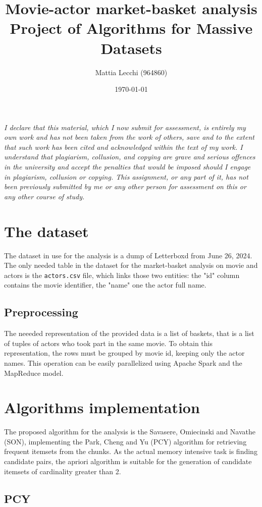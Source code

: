 \documentclass{article}
\author{Mattia Lecchi (964860)}
\date{\today}
\title{Movie-actor market-basket analysis\\ 
	\large Project of Algorithms for Massive Datasets}
\begin{document}
\maketitle
\textit{I declare that this material, which
	I now submit for assessment, is entirely my own work and has not been taken from the
	work of others, save and to the extent that such work has been cited and acknowledged within the
	text of my work. I understand that plagiarism, collusion, and copying are grave and
	serious offences in the university and accept the penalties that would be imposed should I engage
	in plagiarism, collusion or copying. This assignment, or any part of it, has not been previously
	submitted by me or any other person for assessment on this or any other course of study.}

\section{The dataset}
\label{sec:dataset}
The dataset in use for the analysis is a dump of Letterboxd from June 26, 2024.
The only needed table in the dataset for the market-basket analysis on movie and actors is the \texttt{actors.csv} file, which links those two entities: the "id" column contains the movie identifier, the "name" one the actor full name. 

\subsection{Preprocessing}
The neeeded representation of the provided data is a list of baskets, that is a list of tuples of actors who took part in the same movie. To obtain this representation, the rows must be grouped by movie id, keeping only the actor names. This operation can be easily parallelized using Apache Spark and the MapReduce model. 

\section{Algorithms implementation}

The proposed algorithm for the analysis is the Savasere, Omiecinski and Navathe (SON), implementing the Park, Cheng and Yu (PCY) algorithm for retrieving frequent itemsets from the chunks. As the actual memory intensive task is finding candidate pairs, the apriori algorithm is suitable for the generation of candidate itemsets of cardinality greater than 2.

\subsection{PCY}
\end{document}
